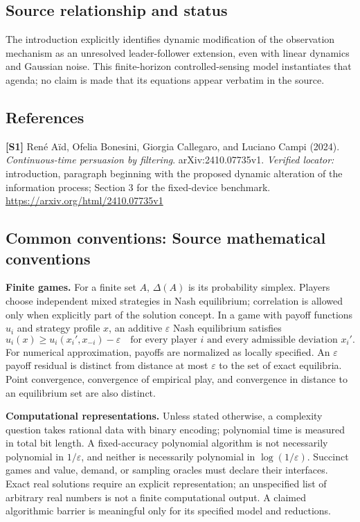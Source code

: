 \documentclass[11pt,a4paper]{article}
\begin{document}
\subsection*{Source relationship and status}
The introduction explicitly identifies dynamic modification of the observation mechanism as an unresolved leader-follower extension, even with linear dynamics and Gaussian noise. This finite-horizon controlled-sensing model instantiates that agenda; no claim is made that its equations appear verbatim in the source.
\subsection*{References}
\begingroup\footnotesize\raggedright
\textbf{[S1]} Ren\'e Aïd, Ofelia Bonesini, Giorgia Callegaro, and Luciano Campi (2024). \emph{Continuous-time persuasion by filtering}. arXiv:2410.07735v1. \textit{Verified locator:} introduction, paragraph beginning with the proposed dynamic alteration of the information process; Section 3 for the fixed-device benchmark. \url{https://arxiv.org/html/2410.07735v1}
\par\endgroup

\subsection*{Common conventions: Source mathematical conventions}

\textbf{Finite games.} For a finite set $A$, $\Delta(A)$ is its probability
simplex. Players choose independent mixed strategies in Nash equilibrium;
correlation is allowed only when explicitly part of the solution concept.
In a game with payoff functions $u_i$ and strategy profile $x$, an additive
$\varepsilon$ Nash equilibrium satisfies
\[
 u_i(x)\geq u_i(x_i',x_{-i})-\varepsilon
 \quad\text{for every player $i$ and every admissible deviation $x_i'$}.
\]
For numerical approximation, payoffs are normalized as locally specified.
An $\varepsilon$ payoff residual is distinct from distance at most
$\varepsilon$ to the set of exact equilibria. Point convergence, convergence
of empirical play, and convergence in distance to an equilibrium set are
also distinct.

\textbf{Computational representations.} Unless stated otherwise, a complexity
question takes rational data with binary encoding; polynomial time is measured
in total bit length. A fixed-accuracy polynomial algorithm is not necessarily
polynomial in $1/\varepsilon$, and neither is necessarily polynomial in
$\log(1/\varepsilon)$. Succinct games and value, demand, or sampling oracles
must declare their interfaces. Exact real solutions require an explicit
representation; an unspecified list of arbitrary real numbers is not a
finite computational output. A claimed algorithmic barrier is meaningful
only for its specified model and reductions.
\end{document}
